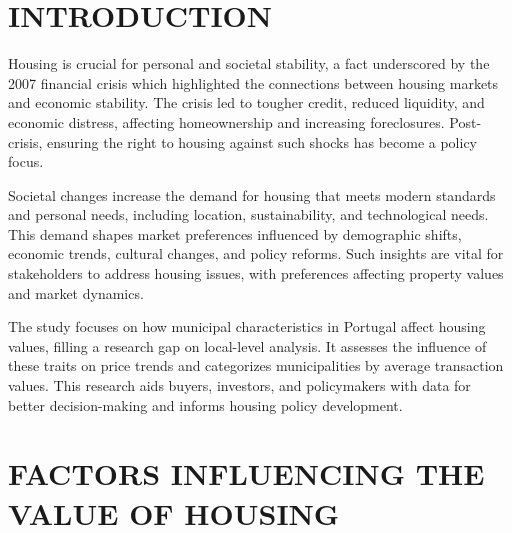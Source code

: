 \documentclass{aip-cp}
\begin{document}
\section{INTRODUCTION}
Housing is crucial for personal and societal stability, a fact underscored by the 2007 financial crisis which highlighted the connections between housing markets and economic stability. The crisis led to tougher credit, reduced liquidity, and economic distress, affecting homeownership and increasing foreclosures. Post-crisis, ensuring the right to housing against such shocks has become a policy focus.

Societal changes increase the demand for housing that meets modern standards and personal needs, including location, sustainability, and technological needs. This demand shapes market preferences influenced by demographic shifts, economic trends, cultural changes, and policy reforms. Such insights are vital for stakeholders to address housing issues, with preferences affecting property values and market dynamics.

The study focuses on how municipal characteristics in Portugal affect housing values, filling a research gap on local-level analysis. It assesses the influence of these traits on price trends and categorizes municipalities by average transaction values. This research aids buyers, investors, and policymakers with data for better decision-making and informs housing policy development.

\section{\uppercase{Factors influencing the value of housing}}
\end{document}
